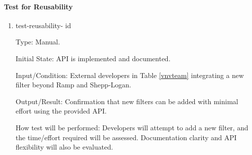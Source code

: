 \documentclass[12pt, titlepage]{article}
\newcounter{testnum}
\newcommand{\dthetestnum}{id\thetestnum}
\begin{document}
\paragraph{Test for Reusability}

\begin{enumerate}

\item{test-reusability- \label{id11} \dthetestnum\\}

Type: Manual.

Initial State: API is implemented and documented.

Input/Condition: External developers in Table \ref{vnvteam} integrating a new filter beyond Ramp and Shepp-Logan.

Output/Result: Confirmation that new filters can be added with minimal effort using the provided API.

How test will be performed: Developers will attempt to add a new filter, and the
time/effort required will be assessed. Documentation clarity and API flexibility
will also be evaluated.
\end{enumerate}
\end{document}
